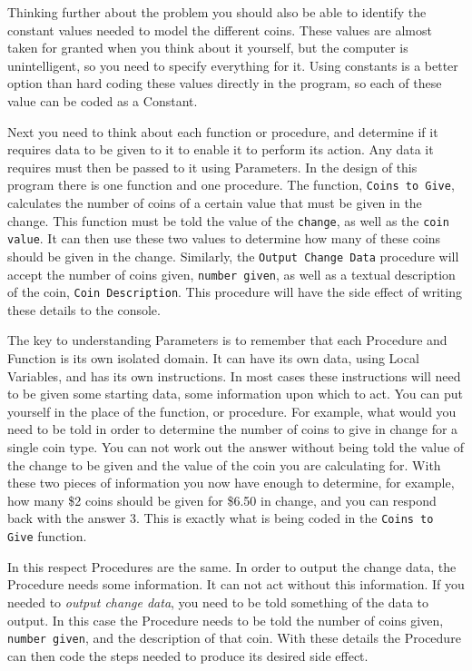 Thinking further about the problem you should also be able to identify the constant values needed to model the different coins. These values are almost taken for granted when you think about it yourself, but the computer is unintelligent, so you need to specify everything for it. Using constants is a better option than hard coding these values directly in the program, so each of these value can be coded as a Constant.

Next you need to think about each function or procedure, and determine if it requires data to be given to it to enable it to perform its action. Any data it requires must then be passed to it using Parameters. In the design of this program there is one function and one procedure. The function, \texttt{Coins to Give}, calculates the number of coins of a certain value that must be given in the change. This function must be told the value of the \texttt{change}, as well as the \texttt{coin value}. It can then use these two values to determine how many of these coins should be given in the change. Similarly, the \texttt{Output Change Data} procedure will accept the number of coins given, \texttt{number given}, as well as a textual description of the coin, \texttt{Coin Description}. This procedure will have the side effect of writing these details to the console.

The key to understanding Parameters is to remember that each Procedure and Function is its own isolated domain. It can have its own data, using Local Variables, and has its own instructions. In most cases these instructions will need to be given some starting data, some information upon which to act. You can put yourself in the place of the function, or procedure. For example, what would you need to be told in order to determine the number of coins to give in change for a single coin type. You can not work out the answer without being told the value of the change to be given and the value of the coin you are calculating for. With these two pieces of information you now have enough to determine, for example, how many \$2 coins should be given for \$6.50 in change, and you can respond back with the answer 3. This is exactly what is being coded in the \texttt{Coins to Give} function.

In this respect Procedures are the same. In order to output the change data, the Procedure needs some information. It can not act without this information. If you needed to \emph{output change data}, you need to be told something of the data to output. In this case the Procedure needs to be told the number of coins given, \texttt{number given}, and the description of that coin. With these details the Procedure can then code the steps needed to produce its desired side effect.

